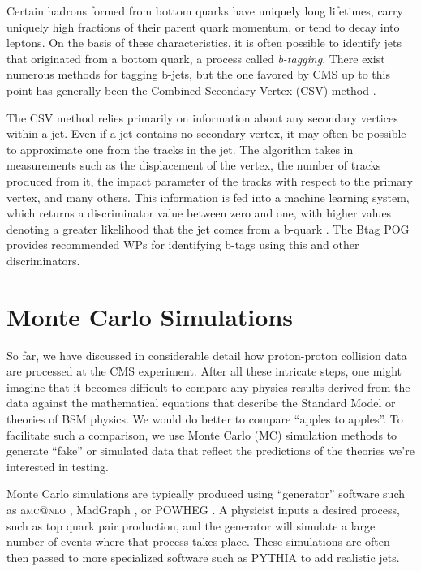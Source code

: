 Certain hadrons formed
from bottom quarks have uniquely long lifetimes, carry uniquely high
fractions of their parent quark momentum, or tend to decay into leptons. On
the basis of these characteristics, it is often possible to identify
jets that originated from a bottom quark, a process called
\emph{b-tagging}. There exist numerous methods for tagging b-jets, but
the one favored by CMS up to this point has generally been the
Combined Secondary Vertex (CSV) method \cite{btag1,btag2}.

The CSV method relies primarily on information about any secondary vertices
within a jet. Even if a jet contains no secondary vertex, it may often
be possible to approximate one from the tracks in the jet. The
algorithm takes in measurements such as the displacement of the
vertex, the number of tracks produced from it, the impact parameter of
the tracks with respect to the primary vertex, and many others. This
information is fed into a machine learning system, which returns a
discriminator value between zero and one, with higher values denoting
a greater likelihood that the jet comes from a b-quark
\cite{btag1,btag2}. The Btag POG provides recommended WPs for
identifying b-tags using this and other discriminators.

\section{Monte Carlo Simulations}
\label{sec:cms:montecarlo}

So far, we have discussed in considerable detail how
proton-proton collision data are processed at the CMS
experiment. After all these intricate steps, one might imagine that it
becomes difficult to compare any physics results derived from the
data against the mathematical equations that describe the Standard
Model or theories of BSM physics. We would do better to compare
``apples to apples''. To facilitate such a comparison, we use Monte
Carlo (MC) simulation methods to generate ``fake'' or simulated data
that reflect the predictions of the theories we're interested in
testing.

Monte Carlo simulations are typically produced using ``generator''
software such as a\textsc{mc@nlo} \cite{madgraph},
MadGraph \cite{madgraph}, or POWHEG \cite{powheg}. A physicist
inputs a desired process, such as top quark pair production, and the
generator will simulate a large number of events where that process
takes place. These simulations are often then passed
to more specialized software such as PYTHIA \cite{pythia} to add realistic jets.

